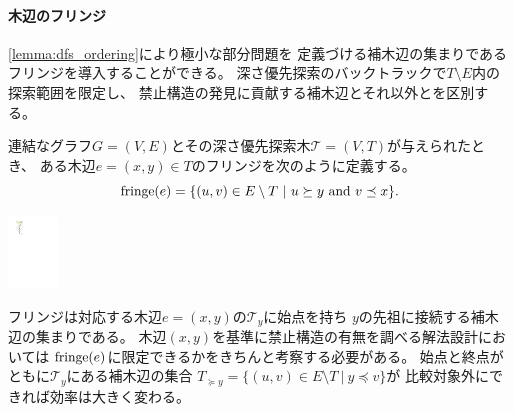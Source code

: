 \begin{paracol}{2}
\paragraph{木辺のフリンジ}
\cref{lemma:dfs_ordering}により極小な部分問題を
定義づける補木辺の集まりであるフリンジを導入することができる。
深さ優先探索のバックトラックで$T \setminus E$内の探索範囲を限定し、
禁止構造の発見に貢献する補木辺とそれ以外とを区別する。


\begin{definition}
連結なグラフ$G=(V, E)$とその深さ優先探索木${\mathcal T}=(V, T)$が与えられたとき、
ある木辺$e = (x, y) \in T$のフリンジを次のように定義する。
\[
\operatorname{fringe}(e) = \{(u, v) \in E \setminus T ~|~ u \succeq y ~\mathrm{and}~ v \preceq x\}.
\]
\end{definition}


\switchcolumn
\vspace{.5\intextsep}
\centering
\includegraphics[width=0.1\textwidth]{figures/fringe_image1.pdf}
\end{paracol}

フリンジは対応する木辺$e=(x, y)$の${\mathcal T}_y$に始点を持ち
$y$の先祖に接続する補木辺の集まりである。
木辺$(x, y)$を基準に禁止構造の有無を調べる解法設計においては
$\operatorname{fringe}(e)$に限定できるかをきちんと考察する必要がある。
始点と終点がともに${\mathcal T}_y$にある補木辺の集合
$T_{\succeq y}=\{(u, v) \in E \setminus T ~|~ y \preceq v\}$が
比較対象外にできれば効率は大きく変わる。

